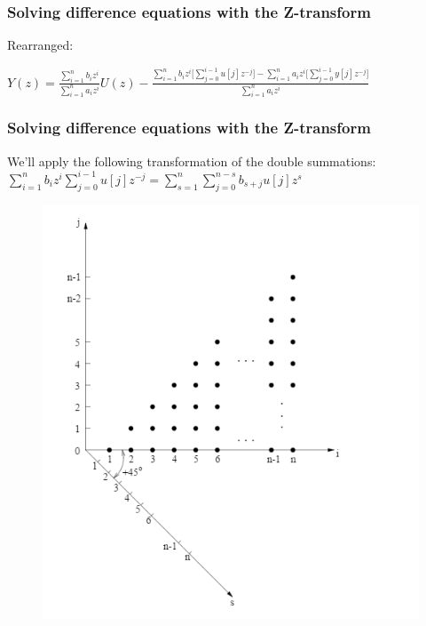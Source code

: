 \begin{frame}
		\frametitle{Solving difference equations with the Z-transform}
		Rearranged:
		\begin{center}
			$Y(z) = \frac{\sum\limits_{i=1}^{n} b_i z^i}{\sum\limits_{i=1}^{n} a_i z^i} U(z) - \frac{\sum\limits_{i=1}^{n} b_i z^i \Bigg[\sum\limits_{j=0}^{i-1}u[j]z^{-j}\Bigg]-\sum\limits_{i=1}^{n} a_i z^i \Bigg[\sum\limits_{j=0}^{i-1}y[j]z^{-j}\Bigg]}{\sum\limits_{i=1}^{n} a_i z^i}$
		\end{center}
\end{frame}
\begin{frame}
	\frametitle{Solving difference equations with the Z-transform}
	We’ll apply the following transformation of the double summations:\\
	$ \sum\limits_{i=1}^{n} b_i z^i \sum\limits_{j=0}^{i-1}u[j]z^{-j} = \sum\limits_{s=1}^{n}\sum\limits_{j=0}^{n-s}b_{s+j}u[j]	z^{s}$
	\begin{figure}
	\centering
	\includegraphics[height = 0.5\textheight]{Images/discrete_time_systems_26}
	\label{fig:discrete_time_systems_26}
	\end{figure}

\end{frame}
